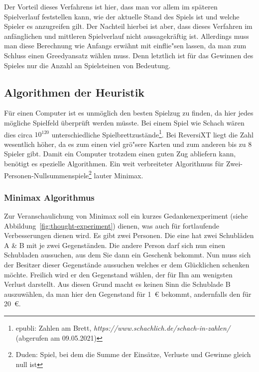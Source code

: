 Der Vorteil dieses Verfahrens ist hier, dass man vor allem im sp\"ateren Spielverlauf feststellen kann, wie der aktuelle Stand des Spiels ist und welche Spieler es anzugreifen gilt.
Der Nachteil hierbei ist aber, dass dieses Verfahren im anf\"anglichen und mittleren Spielverlauf nicht aussagekr\"aftig ist.
Allerdings muss man diese Berechnung wie Anfangs erw\"ahnt mit einflie"sen lassen, da man zum Schluss einen Greedyansatz w\"ahlen muss.
Denn letztlich ist f\"ur das Gewinnen des Spieles nur die Anzahl an Spielsteinen von Bedeutung.


\subsection{Algorithmen der Heuristik}\label{subsec:algorithmen-der-heuristik}
F\"ur einen Computer ist es unm\"oglich den besten Spielzug zu finden, da hier jedes m\"ogliche Spielfeld \"uberpr\"uft werden m\"usste.
Bei einem Spiel wie Schach w\"aren dies circa $10^{120}$ unterschiedliche Spielbrettzust\"ande\footnote{epubli: Zahlen am Brett, \textit{https://www.schachlich.de/schach-in-zahlen/} (abgerufen am 09.05.2021)}.
Bei ReversiXT liegt die Zahl wesentlich h\"oher, da es zum einen viel gr\"o"sere Karten und zum anderen bis zu 8 Spieler gibt.
Damit ein Computer trotzdem einen guten Zug abliefern kann, ben\"otigt es spezielle Algorithmen.
Ein weit verbreiteter Algorithmus f\"ur Zwei-Personen-Nullsummenspiele\footnote{Duden: Spiel, bei dem die Summe der Einsätze, Verluste und Gewinne gleich null ist} lauter Minimax.

\subsubsection{Minimax Algorithmus}
Zur Veranschaulichung von Minimax soll ein kurzes Gedankenexperiment (siehe Abbildung~\ref{fig:thought-experiment}) dienen, was auch f\"ur fortlaufende Verbesserungen dienen wird.
Es gibt zwei Personen.
Die eine hat zwei Schubl\"aden A \& B mit je zwei Gegenst\"anden.
Die andere Person darf sich nun einen Schubladen aussuchen, aus dem Sie dann ein Geschenk bekommt.
Nun muss sich der Besitzer dieser Gegenst\"ande aussuchen welches er dem Gl\"ucklichen schenken m\"ochte.
Freilich wird er den Gegenstand w\"ahlen, der f\"ur Ihn am wenigsten Verlust darstellt.
Aus diesen Grund macht es keinen Sinn die Schublade B auszuw\"ahlen, da man hier den Gegenstand f\"ur 1~\euro{} bekommt, andernfalls den f\"ur 20~\euro{}.

